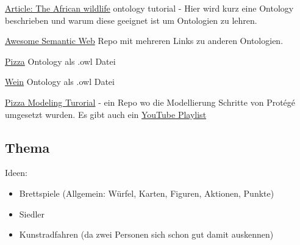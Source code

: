 \documentclass[a4paper]{article}
\begin{document}
\href{https://link.springer.com/article/10.1186/s13326-020-00224-y}{Article: The African wildlife} ontology tutorial - Hier wird kurz eine Ontology beschrieben und warum diese geeignet ist um Ontologien zu lehren.

\href{https://github.com/semantalytics/awesome-semantic-web#educational}{Awesome Semantic Web} Repo mit mehreren Links zu anderen Ontologien.

\href{https://github.com/owlcs/pizza-ontology/blob/master/pizza.owl}{Pizza} Ontology als .owl Datei

\href{https://github.com/UCDavisLibrary/wine-ontology/blob/master/wine-ontology.owl}{Wein} Ontology als .owl Datei

\href{https://github.com/yasenstar/protege_pizza}{Pizza Modeling Turorial} - ein Repo wo die Modellierung Schritte von Protégé umgesetzt wurden. Es gibt auch ein \href{https://www.youtube.com/playlist?list=PL6DEHvciXKeUx4P32B3hKMK1t6mC8RhsW}{YouTube Playlist}

\subsection{Thema}

Ideen:

\begin{itemize}
    \item Brettspiele (Allgemein: Würfel, Karten, Figuren, Aktionen, Punkte)
    \item Siedler
    \item Kunstradfahren (da zwei Personen sich schon gut damit auskennen)
\end{itemize}
\end{document}

